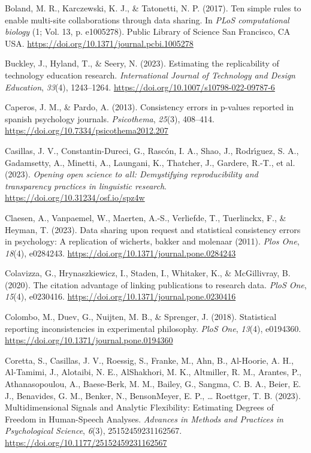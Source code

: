\documentclass[
  doc,
  longtable,
  nolmodern,
  notxfonts,
  notimes,
  colorlinks=true,linkcolor=blue,citecolor=blue,urlcolor=blue]{apa7}
\newlength{\cslhangindent}
\newenvironment{CSLReferences}[2] %
 {\begin{list}{}{%
  \setlength{\itemindent}{0pt}
  \setlength{\leftmargin}{0pt}
  \setlength{\parsep}{0pt}
  \ifodd #1
   \setlength{\leftmargin}{\cslhangindent}
   \setlength{\itemindent}{-1\cslhangindent}
  \fi
  \setlength{\itemsep}{#2\baselineskip}}}
 {\end{list}}
\begin{document}
\begin{CSLReferences}{1}{0}
Boland, M. R., Karczewski, K. J., \& Tatonetti, N. P. (2017). Ten simple
rules to enable multi-site collaborations through data sharing. In
\emph{PLoS computational biology} (1; Vol. 13, p. e1005278). Public
Library of Science San Francisco, CA USA.
\url{https://doi.org/10.1371/journal.pcbi.1005278}

Buckley, J., Hyland, T., \& Seery, N. (2023). Estimating the
replicability of technology education research. \emph{International
Journal of Technology and Design Education}, \emph{33}(4), 1243--1264.
\url{https://doi.org/10.1007/s10798-022-09787-6}

Caperos, J. M., \& Pardo, A. (2013). Consistency errors in p-values
reported in spanish psychology journals. \emph{Psicothema},
\emph{25}(3), 408--414. \url{https://doi.org/10.7334/psicothema2012.207}

Casillas, J. V., Constantin-Dureci, G., Rascón, I. A., Shao, J.,
Rodrı́guez, S. A., Gadamsetty, A., Minetti, A., Laungani, K., Thatcher,
J., Gardere, R.-T., et al. (2023). \emph{Opening open science to all:
Demystifying reproducibility and transparency practices in linguistic
research}. \url{https://doi.org/10.31234/osf.io/spz4w}

Claesen, A., Vanpaemel, W., Maerten, A.-S., Verliefde, T., Tuerlinckx,
F., \& Heyman, T. (2023). Data sharing upon request and statistical
consistency errors in psychology: A replication of wicherts, bakker and
molenaar (2011). \emph{Plos One}, \emph{18}(4), e0284243.
\url{https://doi.org/10.1371/journal.pone.0284243}

Colavizza, G., Hrynaszkiewicz, I., Staden, I., Whitaker, K., \&
McGillivray, B. (2020). The citation advantage of linking publications
to research data. \emph{PloS One}, \emph{15}(4), e0230416.
\url{https://doi.org/10.1371/journal.pone.0230416}

Colombo, M., Duev, G., Nuijten, M. B., \& Sprenger, J. (2018).
Statistical reporting inconsistencies in experimental philosophy.
\emph{PloS One}, \emph{13}(4), e0194360.
\url{https://doi.org/10.1371/journal.pone.0194360}

Coretta, S., Casillas, J. V., Roessig, S., Franke, M., Ahn, B.,
Al-Hoorie, A. H., Al-Tamimi, J., Alotaibi, N. E., AlShakhori, M. K.,
Altmiller, R. M., Arantes, P., Athanasopoulou, A., Baese-Berk, M. M.,
Bailey, G., Sangma, C. B. A., Beier, E. J., Benavides, G. M., Benker,
N., BensonMeyer, E. P., \ldots{} Roettger, T. B. (2023).
Multidimensional {Signals} and {Analytic} {Flexibility}: {Estimating}
{Degrees} of {Freedom} in {Human}-{Speech} {Analyses}. \emph{Advances in
Methods and Practices in Psychological Science}, \emph{6}(3),
25152459231162567. \url{https://doi.org/10.1177/25152459231162567}


\end{CSLReferences}
\end{document}
